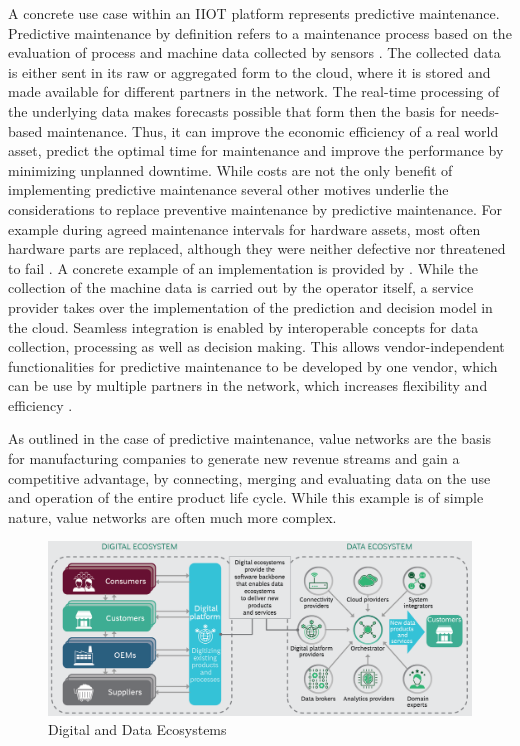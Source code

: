 A concrete use case within an \ac{IIOT} platform represents predictive maintenance. Predictive maintenance by definition refers to a maintenance process based on the evaluation of process and machine data collected by sensors \cite[p. 1670]{Selcuk2016PredictiveTrends:}. The collected data is either sent in its raw or aggregated form to the cloud, where it is stored and made available for different partners in the network. The real-time processing of the underlying data makes forecasts possible that form then the basis for needs-based maintenance. Thus, it can improve the economic efficiency of a real world asset, predict the optimal time for maintenance and improve the performance by minimizing unplanned downtime. While costs are not the only benefit of implementing predictive maintenance several other motives underlie the considerations to replace preventive maintenance by predictive maintenance. For example during agreed maintenance intervals for hardware assets, most often hardware parts are replaced, although they were neither defective nor threatened to fail \cite[p. 1672]{Selcuk2016PredictiveTrends:}. A concrete example of an implementation is provided by \citeauthor[p. 11]{Cavalieri2020AShell}. While the collection of the machine data is carried out by the operator itself, a service provider takes over the implementation of the prediction and decision model in the cloud. Seamless integration is enabled by interoperable concepts for data collection, processing as well as decision making. This allows vendor-independent functionalities for predictive maintenance to be developed by one vendor, which can be use by multiple partners in the network, which increases flexibility and efficiency \cite[p. 9]{Cavalieri2020AShell}.

As outlined in the case of predictive maintenance, value networks are the basis for manufacturing companies to generate new revenue streams and gain a competitive advantage, by connecting, merging and evaluating data on the use and operation of the entire product life cycle. While this example is of simple nature, value networks are often much more complex.

\begin{figure}[h]
\includegraphics[scale=0.35]{content/pictures/digital_ecosystems_bcg.png}
\caption{Digital and Data Ecosystems}
\label{fig:valuenetworksi40}
\end{figure}

